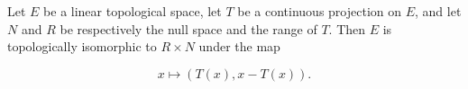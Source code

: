 Let $E$ be a linear topological space, let $T$ be a continuous projection on $E$, and let $N$ and $R$ be respectively the null space and the range of $T$. Then $E$ is topologically isomorphic to $R \times N$ under the map

$$
x \mapsto (T(x), x - T(x)).
$$
